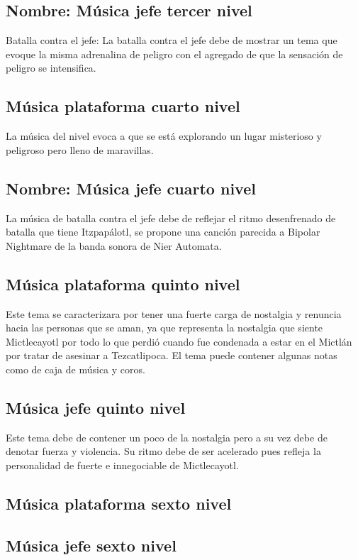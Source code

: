 \subsection{Nombre: Música jefe tercer nivel} \label{Musica:N03_ZN02}
Batalla contra el jefe: La batalla contra el jefe debe de mostrar un tema que evoque la misma adrenalina de peligro con el agregado de que la sensación de peligro se intensifica.

\subsection{Música plataforma cuarto nivel}\label{Musica:N04_ZN01}
La música del nivel evoca a que se está explorando un lugar misterioso y peligroso pero lleno de maravillas.
\subsection{Nombre: Música jefe cuarto nivel} \label{Musica:N04_ZN02}
La música de batalla contra el jefe debe de reflejar el ritmo desenfrenado de batalla que tiene Itzpapálotl, se propone una canción parecida a Bipolar Nightmare de la banda sonora de Nier Automata.

\subsection{Música plataforma quinto nivel} \label{Musica:N05_ZN01}
Este tema se caracterizara por tener una fuerte carga de nostalgia y renuncia hacia las personas que se aman, ya que representa la nostalgia que siente Mictlecayotl por todo lo que perdió cuando fue condenada a estar en el Mictlán por tratar de asesinar a Tezcatlipoca. El tema puede contener algunas notas como de caja de música y coros.

\subsection{Música jefe quinto nivel} \label{Musica:N05_ZN02}
Este tema debe de contener un poco de la nostalgia pero a su vez debe de denotar fuerza y violencia. Su ritmo debe de ser acelerado pues refleja la personalidad de fuerte e innegociable de Mictlecayotl.


\subsection{Música plataforma sexto nivel} \label{Musica:N06_ZN01}
\subsection{Música jefe sexto nivel} \label{Musica:N07_ZN01}